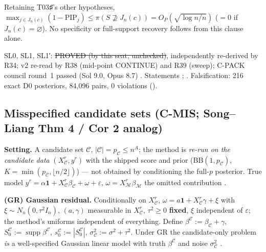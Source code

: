 \begin{corollary}\label{cor:SL1p}
Retaining T03♯'s other hypotheses, $\max_{j\in J_n(c)}(1-\mathrm{PIP}_j)\le\pi(S\not\supseteq J_n(c))=O_P(\sqrt{\log n/n})$ ($=0$ if $J_n(c)=\varnothing$). No specificity or full-support recovery follows from this clause alone.
\end{corollary}
\begin{statusbox}
SL0, SL1, SL1′: \st{PROVED (by this seat, unchecked)}, independently re-derived by R34; v2 re-read by R38 (mid-point CONTINUE) and R39 (sweep); C-PACK council round~1 passed (Sol 9.0, Opus 8.7) . Statements ; . Falsification: 216 exact D0 posteriors, 84,096 pairs, 0 violations ().
\end{statusbox}

\subsection{Misspecified candidate sets (C-MIS; Song--Liang Thm 4 / Cor 2 analog)}\label{sec:mis}
\textbf{Setting.} A candidate set $\mathcal C$, $|\mathcal C|=p_{\mathcal C}\le n^A$; the method is \emph{re-run on the candidate data} $(X^r_{\mathcal C},y^r)$ with the shipped score and prior (BB$(1,p_{\mathcal C})$, $K=\min(p_{\mathcal C},\lfloor n/2\rfloor)$) — not obtained by conditioning the full-$p$ posterior. True model $y^r=\alpha\mathbf 1+X^r_{\mathcal C}\beta_{\mathcal C}+\omega+\varepsilon$, $\omega=X^r_{\mathcal M}\beta_{\mathcal M}$ the omitted contribution .

\textbf{(GR) Gaussian residual.} Conditionally on $X^r_{\mathcal C}$, $\omega=a\mathbf 1+X^r_{\mathcal C}\gamma+\xi$ with $\xi\sim N_n(0,\tau^2I_n)$, $(a,\gamma)$ measurable in $X^r_{\mathcal C}$, $\tau^2\ge0$ \textbf{fixed}, $\xi$ independent of $\varepsilon$; the method's uniforms independent of everything. Define $\beta^{\mathcal C}:=\beta_{\mathcal C}+\gamma$, $S_0^{\mathcal C}:=\operatorname{supp}\beta^{\mathcal C}$, $s_0^{\mathcal C}:=|S_0^{\mathcal C}|$, $\sigma^2_{\mathcal C}:=\sigma^2+\tau^2$. Under GR the candidate-only problem \emph{is} a well-specified Gaussian linear model with truth $\beta^{\mathcal C}$ and noise $\sigma^2_{\mathcal C}$ .

